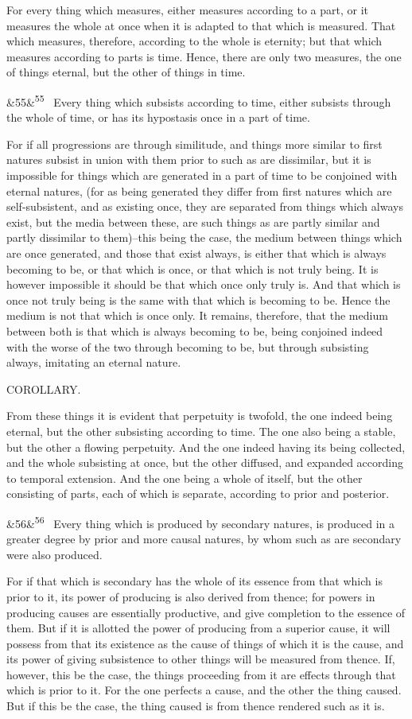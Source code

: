 \documentclass[12pt]{article}
\newcommand{\para}[1][]{\par\noindent\ifx&#1&\else\textsuperscript{\footnotesize #1}~\fi}
\begin{document}
For every thing which measures, either measures according to a part, or it measures the whole at once when it is adapted to that which is measured. That which measures, therefore, according to the whole is eternity; but that which measures according to parts is time. Hence, there are only two measures, the one of things eternal, but the other of things in time.

\para[55] Every thing which subsists according to time, either subsists through the whole of time, or has its hypostasis once in a part of time.

For if all progressions are through similitude, and things more similar to first natures subsist in union with them prior to such as are dissimilar, but it is impossible for things which are generated in a part of time to be conjoined with eternal natures, (for as being generated they differ from first natures which are self-subsistent, and as existing once, they are separated from things which always exist, but the media between these, are such things as are partly similar and partly dissimilar to them)--this being the case, the medium between things which are once generated, and those that exist always, is either that which is always becoming to be, or that which is once, or that which is not truly being. It is however impossible it should be that which once only truly is. And that which is once not truly being is the same with that which is becoming to be. Hence the medium is not that which is once only. It remains, therefore, that the medium between both is that which is always becoming to be, being conjoined indeed with the worse of the two through becoming to be, but through subsisting always, imitating an eternal nature.

COROLLARY.

From these things it is evident that perpetuity is twofold, the one indeed being eternal, but the other subsisting according to time. The one also being a stable, but the other a flowing perpetuity. And the one indeed having its being collected, and the whole subsisting at once, but the other diffused, and expanded according to temporal extension. And the one being a whole of itself, but the other consisting of parts, each of which is separate, according to prior and posterior.

\para[56] Every thing which is produced by secondary natures, is produced in a greater degree by prior and more causal natures, by whom such as are secondary were also produced.

For if that which is secondary has the whole of its essence from that which is prior to it, its power of producing is also derived from thence; for powers in producing causes are essentially productive, and give completion to the essence of them. But if it is allotted the power of producing from a superior cause, it will possess from that its existence as the cause of things of which it is the cause, and its power of giving subsistence to other things will be measured from thence. If, however, this be the case, the things proceeding from it are effects through that which is prior to it. For the one perfects a cause, and the other the thing caused. But if this be the case, the thing caused is from thence rendered such as it is.
\end{document}
